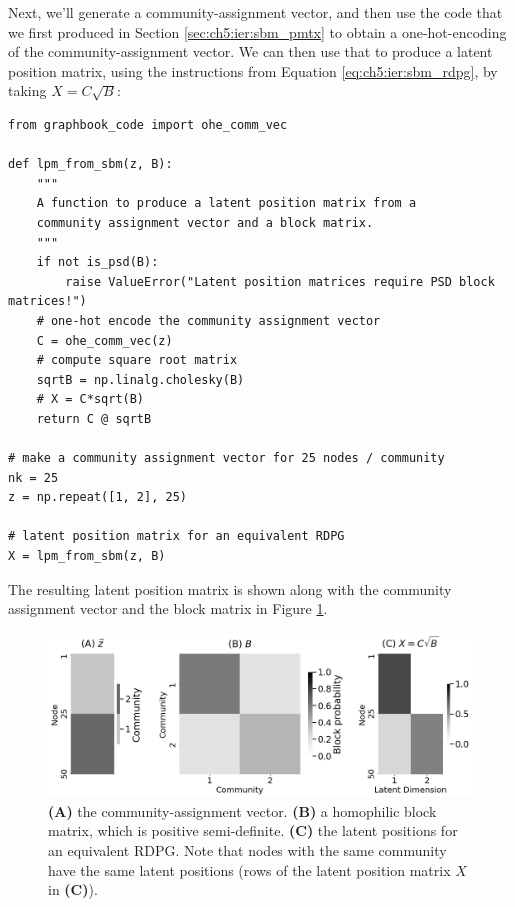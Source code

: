 Next, we'll generate a community-assignment vector, and then use the code that we first produced in Section \ref{sec:ch5:ier:sbm_pmtx} to obtain a one-hot-encoding of the community-assignment vector. We can then use that to produce a latent position matrix, using the instructions from Equation \eqref{eq:ch5:ier:sbm_rdpg}, by taking $X = C\sqrt B$:

\begin{lstlisting}[style=python]
from graphbook_code import ohe_comm_vec

def lpm_from_sbm(z, B):
    """
    A function to produce a latent position matrix from a
    community assignment vector and a block matrix.
    """
    if not is_psd(B):
        raise ValueError("Latent position matrices require PSD block matrices!")
    # one-hot encode the community assignment vector
    C = ohe_comm_vec(z)
    # compute square root matrix
    sqrtB = np.linalg.cholesky(B)
    # X = C*sqrt(B)
    return C @ sqrtB

# make a community assignment vector for 25 nodes / community
nk = 25
z = np.repeat([1, 2], 25)

# latent position matrix for an equivalent RDPG
X = lpm_from_sbm(z, B)
\end{lstlisting}

The resulting latent position matrix is shown along with the community assignment vector and the block matrix in Figure \ref{fig:ch5:psd_block:sbm_lpm}.

\begin{figure}[h]
    \centering
    \includegraphics[width=\linewidth]{representations/ch5/Images/sbm_lpm.png}
    \caption[Latent position matrix for a positive semi-definite SBM]{\textbf{(A)} the community-assignment vector. \textbf{(B)} a homophilic block matrix, which is positive semi-definite. \textbf{(C)} the latent positions for an equivalent RDPG. Note that nodes with the same community have the same latent positions (rows of the latent position matrix $X$ in \textbf{(C)}).}
    \label{fig:ch5:psd_block:sbm_lpm}
\end{figure}

